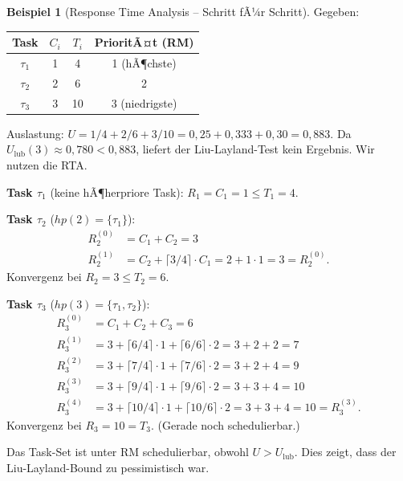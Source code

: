 ﻿\documentclass[a4paper,12pt]{report}
\theoremstyle{definition}
\newtheorem{beispiel}{Beispiel}[chapter]
\begin{document}
\begin{beispiel}[Response Time Analysis -- Schritt fÃ¼r Schritt]
	Gegeben:
	\begin{center}
		\begin{tabular}{cccc}
			\toprule
			Task    & $C_i$ & $T_i$ & PrioritÃ¤t (RM) \\
			\midrule
			$\tau_1$ & 1     & 4     & 1 (hÃ¶chste) \\
			$\tau_2$ & 2     & 6     & 2 \\
			$\tau_3$ & 3     & 10    & 3 (niedrigste) \\
			\bottomrule
		\end{tabular}
	\end{center}

	Auslastung: $U = 1/4 + 2/6 + 3/10 = 0{,}25 + 0{,}333 + 0{,}30 = 0{,}883$.
	Da $U_{\text{lub}}(3) \approx 0{,}780 < 0{,}883$, liefert der Liu-Layland-Test
	kein Ergebnis. Wir nutzen die RTA.

	\textbf{Task $\tau_1$} (keine hÃ¶herpriore Task):
	$R_1 = C_1 = 1 \leq T_1 = 4$. \checkmark

	\textbf{Task $\tau_2$} ($hp(2) = \{\tau_1\}$):
	\begin{align*}
		R_2^{(0)} &= C_1 + C_2 = 3 \\
		R_2^{(1)} &= C_2 + \lceil 3/4 \rceil \cdot C_1 = 2 + 1 \cdot 1 = 3 = R_2^{(0)}.
	\end{align*}
	Konvergenz bei $R_2 = 3 \leq T_2 = 6$. \checkmark

	\textbf{Task $\tau_3$} ($hp(3) = \{\tau_1, \tau_2\}$):
	\begin{align*}
		R_3^{(0)} &= C_1 + C_2 + C_3 = 6 \\
		R_3^{(1)} &= 3 + \lceil 6/4 \rceil \cdot 1 + \lceil 6/6 \rceil \cdot 2 = 3 + 2 + 2 = 7 \\
		R_3^{(2)} &= 3 + \lceil 7/4 \rceil \cdot 1 + \lceil 7/6 \rceil \cdot 2 = 3 + 2 + 4 = 9 \\
		R_3^{(3)} &= 3 + \lceil 9/4 \rceil \cdot 1 + \lceil 9/6 \rceil \cdot 2 = 3 + 3 + 4 = 10 \\
		R_3^{(4)} &= 3 + \lceil 10/4 \rceil \cdot 1 + \lceil 10/6 \rceil \cdot 2 = 3 + 3 + 4 = 10 = R_3^{(3)}.
	\end{align*}
	Konvergenz bei $R_3 = 10 = T_3$. \checkmark (Gerade noch schedulierbar.)

	Das Task-Set ist unter RM schedulierbar, obwohl $U > U_{\text{lub}}$.
	Dies zeigt, dass der Liu-Layland-Bound zu pessimistisch war.
\end{beispiel}
\end{document}
